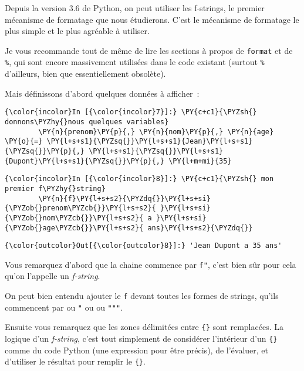     Depuis la version 3.6 de Python, on peut utiliser les f-strings, le
premier mécanisme de formatage que nous étudierons. C'est le mécanisme
de formatage le plus simple et le plus agréable à utiliser.

Je vous recommande tout de même de lire les sections à propos de
\texttt{format} et de \texttt{\%}, qui sont encore massivement utilisées
dans le code existant (surtout \texttt{\%} d'ailleurs, bien que
essentiellement obsolète).

    Mais définissons d'abord quelques données à afficher~:

    \begin{Verbatim}[commandchars=\\\{\}]
{\color{incolor}In [{\color{incolor}7}]:} \PY{c+c1}{\PYZsh{} donnons\PYZhy{}nous quelques variables}
        \PY{n}{prenom}\PY{p}{,} \PY{n}{nom}\PY{p}{,} \PY{n}{age} \PY{o}{=} \PY{l+s+s1}{\PYZsq{}}\PY{l+s+s1}{Jean}\PY{l+s+s1}{\PYZsq{}}\PY{p}{,} \PY{l+s+s1}{\PYZsq{}}\PY{l+s+s1}{Dupont}\PY{l+s+s1}{\PYZsq{}}\PY{p}{,} \PY{l+m+mi}{35}
\end{Verbatim}


    \begin{Verbatim}[commandchars=\\\{\}]
{\color{incolor}In [{\color{incolor}8}]:} \PY{c+c1}{\PYZsh{} mon premier f\PYZhy{}string}
        \PY{n}{f}\PY{l+s+s2}{\PYZdq{}}\PY{l+s+si}{\PYZob{}prenom\PYZcb{}}\PY{l+s+s2}{ }\PY{l+s+si}{\PYZob{}nom\PYZcb{}}\PY{l+s+s2}{ a }\PY{l+s+si}{\PYZob{}age\PYZcb{}}\PY{l+s+s2}{ ans}\PY{l+s+s2}{\PYZdq{}}
\end{Verbatim}


\begin{Verbatim}[commandchars=\\\{\}]
{\color{outcolor}Out[{\color{outcolor}8}]:} 'Jean Dupont a 35 ans'
\end{Verbatim}
            
    Vous remarquez d'abord que la chaine commence par \texttt{f"}, c'est
bien sûr pour cela qu'on l'appelle un \emph{f-string}.

On peut bien entendu ajouter le \texttt{f} devant toutes les formes de
strings, qu'ils commencent par \texttt{\textquotesingle{}} ou \texttt{"}
ou \texttt{\textquotesingle{}\textquotesingle{}\textquotesingle{}} ou
\texttt{"""}.

    Ensuite vous remarquez que les zones délimitées entre \texttt{\{\}} sont
remplacées. La logique d'un \emph{f-string}, c'est tout simplement de
considérer l'intérieur d'un \texttt{\{\}} comme du code Python (une
expression pour être précis), de l'évaluer, et d'utiliser le résultat
pour remplir le \texttt{\{\}}.

